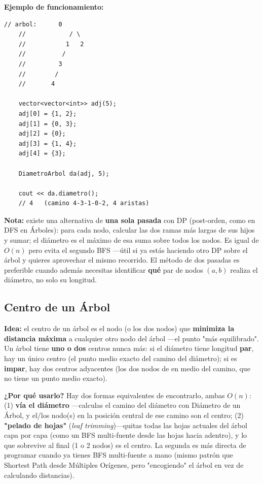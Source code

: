 \documentclass[10pt,a4paper,twocolumn]{article}
\begin{document}
\textbf{Ejemplo de funcionamiento:}

\begin{lstlisting}[style=cpp]
	// arbol:      0
	//            / \
	//           1   2
	//          /
	//         3
	//        /
	//       4
	
	vector<vector<int>> adj(5);
	adj[0] = {1, 2};
	adj[1] = {0, 3};
	adj[2] = {0};
	adj[3] = {1, 4};
	adj[4] = {3};
	
	DiametroArbol da(adj, 5);
	
	cout << da.diametro();
	// 4   (camino 4-3-1-0-2, 4 aristas)
\end{lstlisting}

\textbf{Nota:} existe una alternativa de \textbf{una sola pasada} con
DP (post-orden, como en DFS en Árboles): para cada nodo, calcular las
dos ramas más largas de sus hijos y sumar; el diámetro es el máximo
de esa suma sobre todos los nodos. Es igual de $O(n)$ pero evita el
segundo BFS —útil si ya estás haciendo otro DP sobre el árbol y
quieres aprovechar el mismo recorrido. El método de dos pasadas es
preferible cuando además necesitas identificar \textbf{qué} par de
nodos $(a,b)$ realiza el diámetro, no solo su longitud.


\subsection{Centro de un Árbol}

\textbf{Idea:} el centro de un árbol es el nodo (o los dos nodos)
que \textbf{minimiza la distancia máxima} a cualquier otro nodo del
árbol —el punto "más equilibrado". Un árbol tiene \textbf{uno o dos}
centros nunca más: si el diámetro tiene longitud \textbf{par}, hay un
único centro (el punto medio exacto del camino del diámetro); si es
\textbf{impar}, hay dos centros adyacentes (los dos nodos de en medio
del camino, que no tiene un punto medio exacto).

\textbf{¿Por qué usarlo?} Hay dos formas equivalentes de encontrarlo,
ambas $O(n)$: (1) \textbf{vía el diámetro} —calculas el camino del
diámetro con Diámetro de un Árbol, y el/los nodo(s) en la posición
central de ese camino son el centro; (2) \textbf{"pelado de hojas"}
(\textit{leaf trimming})—quitas todas las hojas actuales del árbol
capa por capa (como un BFS multi-fuente desde las hojas hacia
adentro), y lo que sobrevive al final (1 o 2 nodos) es el centro. La
segunda es más directa de programar cuando ya tienes BFS
multi-fuente a mano (mismo patrón que Shortest Path desde Múltiples
Orígenes, pero "encogiendo" el árbol en vez de calculando distancias).
\end{document}
